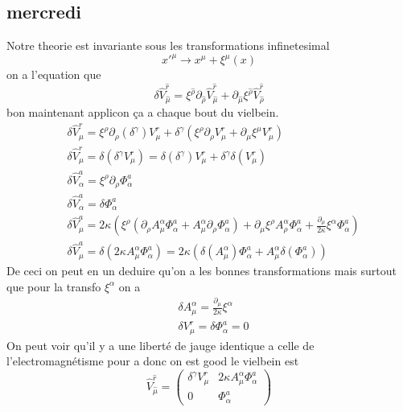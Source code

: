 \documentclass{article}
\begin{document}
\subsection{mercredi}
Notre theorie est invariante sous les transformations infinetesimal
\[ x'^{\mu} \rightarrow x^{\mu} + \xi^{\mu}(x)  \]
on  a l'equation que 
\begin{equation}
    \delta\hat{V}^{\hat{r}}_{\hat{\mu}} = \xi^{\hat{\rho}}\partial_{\hat{\rho}} \hat{V}^{\hat{r}}_{\hat{\mu}} + \partial_{\hat{\mu}}\xi^{\hat{\rho}}\hat{V}^{\hat{r}}_{\hat{\rho}} 
\end{equation}
bon maintenant applicon ça a chaque bout du vielbein.
\begin{align*}
    &\delta\hat{V}^{r}_{\mu}= \xi^{\rho}\partial_{\rho}(\delta^{\gamma})V^{r}_{\mu} + \delta^{\gamma}(\xi^{\rho}\partial_{\rho}V^{r}_{\mu} + \partial_{\mu}\xi^{\mu}V^{r}_{\mu}  )\\
    &\delta\hat{V}^{r}_{\mu}=\delta(\delta^{\gamma}V^{r}_{\mu}) = \delta(\delta^{\gamma})V^{r}_{\mu} + \delta^{\gamma}\delta(V^{r}_{\mu})\\
    &\delta\hat{V}^{a}_{\alpha}= \xi^{\rho}\partial_{\rho}\Phi^{a}_{\alpha}\\
    &\delta\hat{V}^{a}_{\alpha}=\delta \Phi^{a}_{\alpha}\\
    &\delta\hat{V}^{a}_{\mu}= 2\kappa(\xi^{\rho}(\partial_{\rho}A^{\alpha}_{\mu} \Phi^{a}_{\alpha} + A^{\alpha}_{\mu} \partial_{\rho}\Phi^{a}_{\alpha}) + \partial_{\mu}\xi^{\rho} A^{\alpha}_{\rho}\Phi^{a}_{\alpha}+\frac{\partial_{\mu}}{2 \kappa}\xi^{\alpha}\Phi^a_{\alpha})\\
    &\delta\hat{V}^{a}_{\mu}=\delta(2\kappa A^{\alpha}_{\mu} \Phi^{a}_{\alpha}) = 2\kappa(\delta(A^{\alpha}_{\mu})\Phi^{a}_{\alpha} + A^{\alpha}_{\mu}\delta(\Phi^{a}_{\alpha}))
\end{align*}
De ceci on peut en un deduire qu'on a les bonnes transformations mais surtout que pour la transfo \( \xi^{\alpha} \) on a 
\begin{align}
    &\delta A^{\alpha}_{\mu} = \frac{\partial_{\mu}}{2 \kappa}\xi^{\alpha}\\
    & \delta V^r_{\mu} = \delta \Phi_{\alpha}^a=0
\end{align}
On peut voir qu'il y a une liberté de jauge identique a celle de l'electromagnétisme pour a donc on est good
le vielbein est 
\begin{equation}
    \hat{V}^{\hat{r}}_{\hat\mu} = \begin{pmatrix} \delta^\gamma V^r_\mu & 2\kappa A^\alpha_\mu \Phi^a_\alpha \\ 0 & \Phi^a_\alpha \end{pmatrix}
\end{equation}
\end{document}
